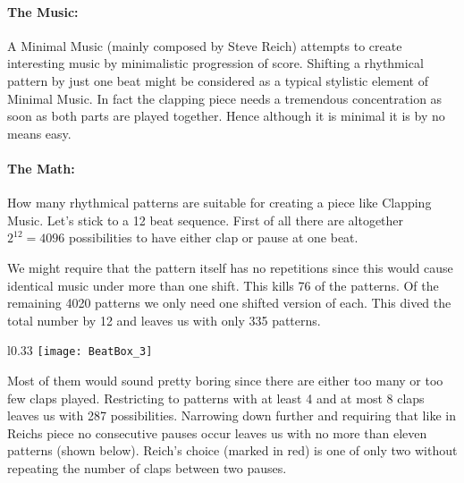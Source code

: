 \paragraph{The Music:}
A Minimal Music (mainly composed by Steve Reich) attempts to create interesting music by minimalistic progression of score. Shifting a rhythmical pattern by just one beat might be considered as a typical stylistic element of Minimal Music. In fact the clapping piece needs a tremendous concentration as soon as both parts are played together. Hence although it is minimal it is by no means easy.

\paragraph{The Math:} How many rhythmical patterns are suitable for creating a piece like Clapping Music. Let's stick to a 12 beat sequence. First of all there are altogether $2^{12} = 4096$ possibilities to have either clap or pause at one beat.

We might require that the pattern itself has no repetitions since this would cause identical music under more than one shift. This kills 76 of the patterns. Of the remaining 4020 patterns we only need one shifted version of each. This dived the total number by 12 and leaves us with only 335 patterns.

\begin{wrapfigure}[13]{l}{0.33\textwidth}
\centering
\texttt{[image: BeatBox\_3]}
\end{wrapfigure}

Most of them would sound pretty boring since there are either too many or too few claps played. Restricting to patterns with at least 4 and at most 8 claps leaves us with 287 possibilities. Narrowing down further and requiring that like in Reichs piece no consecutive pauses occur leaves us with no more than eleven patterns (shown below). Reich's choice (marked in red) is one of only two without repeating the number of claps between two pauses.

\hfill {}

